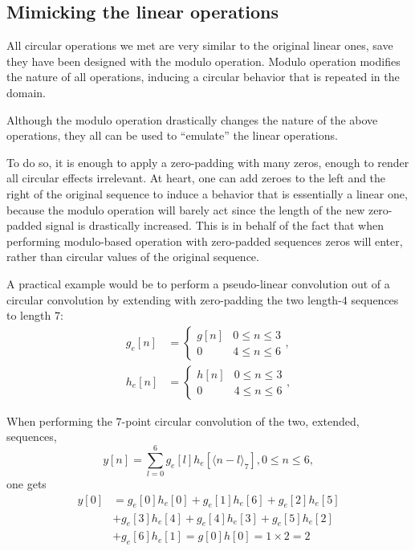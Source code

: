 \documentclass[\documentfontsize, twocolumn]{\classname}
\begin{document}
\subsection{Mimicking the linear operations}\label{sec:mimickingLinearOperations}
All circular operations we met are very similar to the original linear ones, save they have been designed with the modulo operation. Modulo operation modifies the nature of all operations, inducing a circular behavior that is repeated in the domain.

Although the modulo operation drastically changes the nature of the above operations, they all can be used to ``emulate'' the linear operations.

To do so, it is enough to apply a zero-padding with many zeros, enough to render all circular effects irrelevant. At heart, one can add zeroes to the left and the right of the original sequence to induce a behavior that is essentially a linear one, because the modulo operation will barely act since the length of the new zero-padded signal is drastically increased. This is in behalf of the fact that when performing modulo-based operation with zero-padded sequences zeros will enter, rather than circular values of the original sequence.

A practical example would be to perform a pseudo-linear convolution out of a circular convolution by extending with zero-padding the two length-$4$ sequences to length $7$:
\begin{align*}
    g_e[n] &= 
    \left\{\begin{array}{ll}
    g[n] & 0 \leq n \leq 3\\
    0 & 4 \leq n \leq 6
    \end{array}
    \right.,\\
    h_e[n] &= 
    \left\{\begin{array}{ll}
    h[n] & 0 \leq n \leq 3\\
    0 & 4 \leq n \leq 6
    \end{array}
    \right.,
\end{align*}

When performing the $7$-point circular convolution of the two, extended, sequences,
\[
    y[n] = \sum_{l=0}^6 g_e[l] h_e[\langle n - l \rangle_7], 0 \leq n \leq 6,
\]
one gets
\begin{align*}
    y[0] 
    &= g_e[0]h_e[0] + g_e[1]h_e[6] + g_e[2]h_e[5]\\
    &+ g_e[3]h_e[4] + g_e[4]h_e[3] + g_e[5]h_e[2]\\
    &+ g_e[6]h_e[1] = g[0]h[0] = 1 \times 2 = 2
\end{align*}
\end{document}
